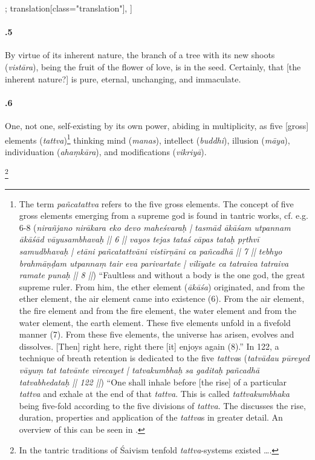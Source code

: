 \begin{alignment}[
  texts=edition[class="edition"];
  translation[class="translation"],
  ]
\begin{translation}
\begin{tlate}[21_5]
      \paragraph{.5} By virtue of its inherent nature, the branch of a tree with its new shoots (\textit{vistāra}), being the fruit of the flower of love, is in the seed. Certainly, that [the inherent nature?] is pure, eternal, unchanging, and immaculate.
    \end{tlate}
    \begin{tlate}[21_6]
     \paragraph{.6} One, not one, self-existing by its own power, abiding in multiplicity, as five [gross] elements (\textit{tattva})\footnote{The term \textit{pañcatattva} refers to the five gross elements. The concept of five gross elements emerging from a supreme god is found in tantric works, cf. e.g.  6-8 (\textit{nirañjano nirākara eko devo maheśvaraḥ | tasmād ākāśam utpannam ākāśād vāyusambhavaḥ || 6 || vayos tejas tataś cāpas tataḥ pṛthvī samudbhavaḥ | etāni pañcatattvāni vistīrṇāni ca pañcadhā || 7 || tebhyo brahmāṇḍam utpannaṃ tair eva parivartate | vilīyate ca tatraiva tatraiva ramate punaḥ || 8 ||}) 
       ``Faultless and without a body is the one god, the great supreme ruler. From him, the ether element (\textit{ākāśa}) originated, and from the ether element, the air element came into existence (6). From the air element, the fire element and from the fire element, the water element and from the water element, the earth element. These five elements unfold in a fivefold manner (7). From these five elements, the universe has arisen, evolves and dissolves. [Then] right here, right there [it] enjoys again (8).'' In  122, a technique of breath retention is dedicated to the five \textit{tattva}s (\textit{tatvādau pūreyed vāyuṃ tat tatvānte virecayet | tatvakumbhaḥ sa gaditaḥ pañcadhā tatvabhedataḥ || 122 ||}) ``One shall inhale before [the rise] of a particular \textit{tattva} and exhale at the end of that \textit{tattva}. This is called \textit{tattvakumbhaka} being five-fold according to the five divisions of \textit{tattva}. The  discusses the rise, duration, properties and application of the \textit{tattva}s in greater detail. An overview of this can be seen in \citeauthor[2021: Appendix-]{kumbhaka}.} thinking mind (\textit{manas}), intellect (\textit{buddhi}), illusion (\textit{māya}), individuation (\textit{ahaṃkāra}), and modifications (\textit{vikriyā}).\begin{buber}[f21_1]\footnote{In the tantric traditions of Śaivism tenfold \textit{tattva}-systems existed \ldots.}\end{buber}
   \end{tlate}
   \begin{tlate}[21_7]

\end{tlate}
\end{translation}
\end{alignment}
